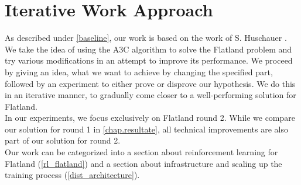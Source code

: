 \section{Iterative Work Approach}\label{basic_cons}
As described under \autoref{baseline}, our work is based on the work of S. Huschauer \cite{flatlandstephan}. We take the idea of using the A3C algorithm to solve the Flatland problem and try various modifications in an attempt to improve its performance. We proceed by giving an idea, what we want to achieve by changing the specified part, followed by an experiment to either prove or disprove our hypothesis. We do this in an iterative manner, to gradually come closer to a well-performing solution for Flatland.\\
In our experiments, we focus exclusively on Flatland round 2. While we compare our solution for round 1 in \autoref{chap.resultate}, all technical improvements are also part of our solution for round 2.\\
Our work can be categorized into a section about reinforcement learning for Flatland (\autoref{rl_flatland}) and a section about infrastructure and scaling up the training process (\autoref{dist_architecture}).\\
